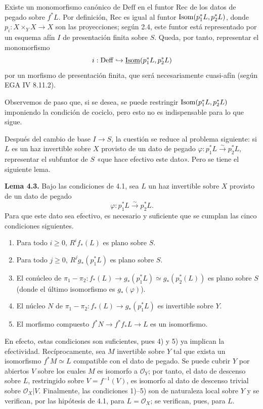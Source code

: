Existe un monomorfismo canónico de $\mathrm{Deff}$ en el funtor
$\mathrm{Rec}$ de los datos de pegado sobre $f^*L$. Por definición,
$\mathrm{Rec}$ es igual al funtor $\operatorname{Isom}(p_1^*L,p_2^*L)$, donde
$p_i:X\times_YX\to X$ son las proyecciones; según 2.4, este funtor está
representado por un esquema afín $I$ de presentación finita sobre $S$.
Queda, por tanto, representar el monomorfismo
\[
i:\mathrm{Deff}\hookrightarrow \underline{\operatorname{Isom}}(p_1^*L,p_2^*L)
\]
por un morfismo de presentación finita, que será necesariamente cuasi-afín
(según EGA IV 8.11.2).

Observemos de paso que, si se desea, se puede restringir
$\operatorname{Isom}(p_1^*L,p_2^*L)$ imponiendo la condición de cociclo, pero esto no es
indispensable para lo que sigue.

Después del cambio de base $I\to S$, la cuestión se reduce al problema
siguiente: si $L$ es un haz invertible sobre $X$ provisto de un dato de
pegado $\varphi:p_1^*L\xrightarrow{\sim}p_2^*L$, representar el subfuntor de
$S$ «que hace efectivo este dato». Pero se tiene el siguiente lema.

\textbf{Lema 4.3.} Bajo las condiciones de 4.1, sea $L$ un haz invertible
sobre $X$ provisto de un dato de pegado
\[
\varphi:p_1^*L\xrightarrow{\sim}p_2^*L.
\]
Para que este dato sea efectivo, es necesario y suficiente que se cumplan
las cinco condiciones siguientes.
\begin{enumerate}[label=\arabic*)]
\item Para todo $i\geq0$, $R^if_*(L)$ es plano sobre $S$.
\item Para todo $j\geq0$, $R^jg_*(p_1^*L)$ es plano sobre $S$.
\item El conúcleo de
$\pi_1-\pi_2:f_*(L)\longrightarrow
g_*(p_1^*L)\simeq g_*(p_2^*(L))$ es plano sobre $S$ (donde el último
isomorfismo es $g_*(\varphi)$).
\item El núcleo $N$ de
$\pi_1-\pi_2:f_*(L)\to g_*(p_1^*L)$ es invertible sobre $Y$.
\item El morfismo compuesto $f^*N\to f^*f_*L\to L$ es un isomorfismo.
\end{enumerate}
En efecto, estas condiciones son suficientes, pues 4) y 5) ya implican la
efectividad. Recíprocamente, sea $M$ invertible sobre $Y$ tal que exista un
isomorfismo $f^*M\simeq L$ compatible con el dato de pegado. Se puede cubrir
$Y$ por abiertos $V$ sobre los cuales $M$ es isomorfo a $\mathcal O_Y$; por
tanto, el dato de descenso sobre $L$, restringido sobre
$V=f^{-1}(V)$, es isomorfo al dato de descenso trivial sobre
$\mathcal O_X|V$. Finalmente, las condiciones 1)--5) son de naturaleza
local sobre $Y$ y se verifican, por las hipótesis de 4.1, para
$L=\mathcal O_X$; se verifican, pues, para $L$.

